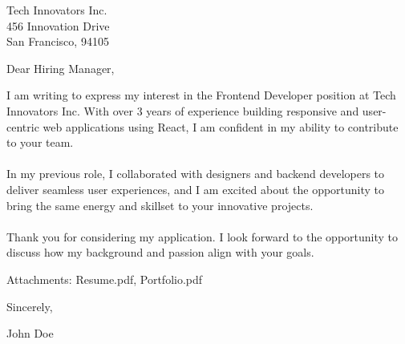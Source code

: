 \documentclass[11pt,a4paper]{letter}
\begin{document}
\begin{letter}{
Tech Innovators Inc.\\
456 Innovation Drive\\
San Francisco, 94105
}

\address{
John Doe\\
123 Main Street\\
New York, 10001\\
+1234567890\\
\href{mailto:john.doe@example.com}{john.doe@example.com}
}

\date{April 15, 2025}

\opening{Dear Hiring Manager,}

I am writing to express my interest in the Frontend Developer position at Tech Innovators Inc. With over 3 years of experience building responsive and user-centric web applications using React, I am confident in my ability to contribute to your team.\\
\\
In my previous role, I collaborated with designers and backend developers to deliver seamless user experiences, and I am excited about the opportunity to bring the same energy and skillset to your innovative projects.\\
\\
Thank you for considering my application. I look forward to the opportunity to discuss how my background and passion align with your goals.

\vspace{\baselineskip}
\noindent Attachments: Resume.pdf, Portfolio.pdf

\closing{Sincerely,}

John Doe

\end{letter}
\end{document}
